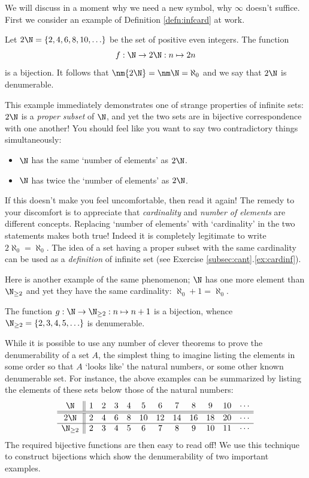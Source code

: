We will discuss in a moment why we need a new symbol, why $\infty$ doesn't suffice. First we consider an example of Definition \ref{defn:infcard} at work.

\begin{example}{}{}
	Let $2\N=\{2,4,6,8,10,\ldots\}$ be the set of positive even integers. The function
	\[
		f:\N\to 2\N:n\mapsto 2n
	\]
	is a bijection. It follows that $\nm{2\N}=\nm\N=\aleph_0$ and we say that $2\N$ is denumerable.
\end{example}

This example immediately demonstrates one of strange properties of infinite sets: $2\N$ is a \emph{proper subset} of $\N$, and yet the two sets are in bijective correspondence with one another! You should feel like you want to say two contradictory things simultaneously:
\begin{itemize}
  \item $\N$ has the same `number of elements' as $2\N$.
  \item $\N$ has twice the `number of elements' as $2\N$.
\end{itemize}
If this doesn't make you feel uncomfortable, then read it again! The remedy to your discomfort is to appreciate that \emph{cardinality} and \emph{number of elements} are different concepts. Replacing `number of elements' with `cardinality' in the two statements makes both true! Indeed it is completely legitimate to write $2\aleph_0=\aleph_0$. The idea of a set having a proper subset with the same cardinality can be used as a \emph{definition} of infinite set (see Exercise \ref*{subsec:cant}.\ref{ex:cardinf}).\par

Here is another example of the same phenomenon; $\N$ has one more element than $\N_{\ge 2}$ and yet they have the same cardinality: $\aleph_0+1=\aleph_0$.

\begin{example}{}{}
	The function $g:\N\to\N_{\ge 2}:n\mapsto n+1$ is a bijection, whence $\N_{\ge 2}=\{2,3,4,5,\ldots\}$ is denumerable.
\end{example}




While it is possible to use any number of clever theorems to prove the denumerability of a set $A$, the simplest thing to imagine listing the elements in some order so that $A$ `looks like' the natural numbers, or some other known denumerable set. For instance, the above examples can be summarized by listing the elements of these sets below those of the natural numbers:
\[
	\begin{array}{c||ccccccccccc}
		\N&1&2&3&4&5&6&7&8&9&10&\cdots\\\hline\hline
		2\N&2&4&6&8&10&12&14&16&18&20&\cdots\\\hline
		\N_{\ge 2}&2&3&4&5&6&7&8&9&10&11&\cdots
	\end{array}
\]
The required bijective functions are then easy to read off! We use this technique to construct bijections which show the denumerability of two important examples.

